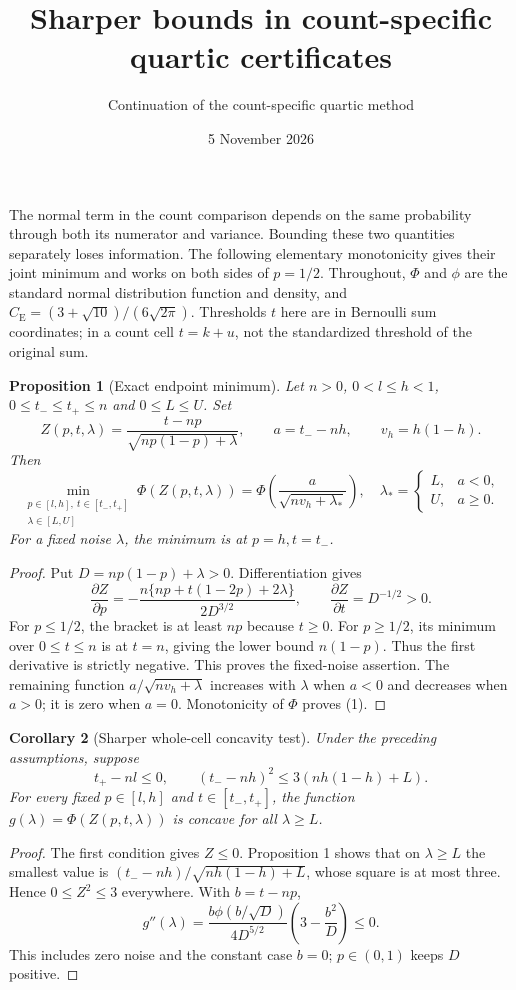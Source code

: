 \documentclass[11pt,a4paper]{article}
\title{Sharper bounds in count-specific quartic certificates}
\author{Continuation of the count-specific quartic method}
\date{5 November 2026}
\newtheorem{proposition}{Proposition}
\newtheorem{corollary}[proposition]{Corollary}
\begin{document}
\maketitle
The normal term in the count comparison depends on the same probability
through both its numerator and variance. Bounding these two quantities
separately loses information. The following elementary monotonicity gives
their joint minimum and works on both sides of $p=1/2$.
Throughout, $\Phi$ and $\phi$ are the standard normal distribution function
and density, and $C_{\mathrm E}=(3+\sqrt{10})/(6\sqrt{2\pi})$.
Thresholds $t$ here are in Bernoulli sum coordinates; in a
count cell $t=k+u$, not the standardized threshold of the original sum.

\begin{proposition}[Exact endpoint minimum]
Let $n>0$, $0<l\le h<1$, $0\le t_-\le t_+\le n$ and
$0\le L\le U$. Set
\[
 Z(p,t,\lambda)=\frac{t-np}{\sqrt{np(1-p)+\lambda}},
 \qquad a=t_--nh,\qquad v_h=h(1-h).
\]
Then
\[
 \min_{\substack{p\in[l,h],\ t\in[t_-,t_+]\\\lambda\in[L,U]}}
 \Phi(Z(p,t,\lambda))
 =\Phi\left(\frac{a}{\sqrt{nv_h+\lambda_*}}\right),
 \quad
 \lambda_*=
 \begin{cases} L,&a<0,\\ U,&a\ge0.\end{cases}
 \tag{1}
\]
For a fixed noise $\lambda$, the minimum is at $p=h,t=t_-$.
\end{proposition}
\begin{proof}
Put $D=np(1-p)+\lambda>0$. Differentiation gives
\[
 \frac{\partial Z}{\partial p}
 =-\frac{n\{np+t(1-2p)+2\lambda\}}{2D^{3/2}},
 \qquad \frac{\partial Z}{\partial t}=D^{-1/2}>0.
 \tag{2}
\]
For $p\le1/2$, the bracket is at least $np$ because $t\ge0$.
For $p\ge1/2$, its minimum over $0\le t\le n$ is at $t=n$,
giving the lower bound $n(1-p)$. Thus the first derivative is
strictly negative. This proves the fixed-noise assertion. The remaining
function $a/\sqrt{nv_h+\lambda}$ increases with $\lambda$ when $a<0$
and decreases when $a>0$; it is zero when $a=0$. Monotonicity of $\Phi$
proves (1).
\end{proof}

\begin{corollary}[Sharper whole-cell concavity test]
Under the preceding assumptions, suppose
\[
 t_+-nl\le0,\qquad (t_--nh)^2\le3(nh(1-h)+L).
 \tag{3}
\]
For every fixed $p\in[l,h]$ and $t\in[t_-,t_+]$, the function
$g(\lambda)=\Phi(Z(p,t,\lambda))$ is concave for all $\lambda\ge L$.
\end{corollary}
\begin{proof}
The first condition gives $Z\le0$. Proposition 1 shows that on
$\lambda\ge L$ the smallest value is
$(t_--nh)/\sqrt{nh(1-h)+L}$, whose square is at most three.
Hence $0\le Z^2\le3$ everywhere. With $b=t-np$,
\[
 g''(\lambda)=\frac{b\phi(b/\sqrt D)}{4D^{5/2}}
                    \left(3-\frac{b^2}{D}\right)\le0.
\]
This includes zero noise and the constant case $b=0$; $p\in(0,1)$
keeps $D$ positive.
\end{proof}
\end{document}
